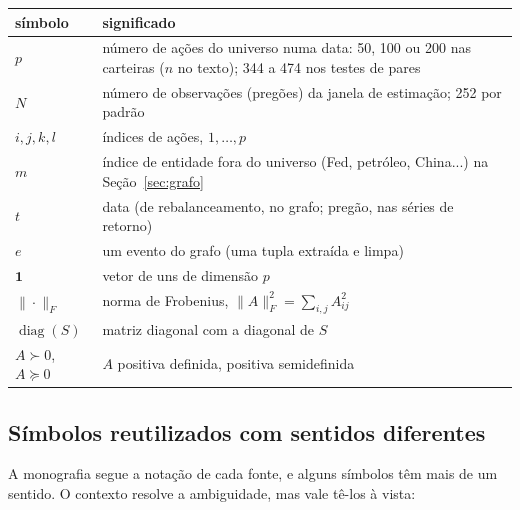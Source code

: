 \documentclass[11pt,a4paper]{article}
\newcommand{\un}{\mathbf 1}
\begin{document}
\begin{center}
\small
\begin{tabularx}{\textwidth}{>{\raggedright\arraybackslash}p{2.4cm}X}
\toprule
símbolo & significado \\
\midrule
$p$ & número de ações do universo numa data: 50, 100 ou 200 nas carteiras ($n$ no texto); 344 a 474 nos testes de pares \\
$N$ & número de observações (pregões) da janela de estimação; 252 por padrão \\
$i,j,k,l$ & índices de ações, $1,\dots,p$ \\
$m$ & índice de entidade fora do universo (Fed, petróleo, China...) na Seção~\ref{sec:grafo} \\
$t$ & data (de rebalanceamento, no grafo; pregão, nas séries de retorno) \\
$e$ & um evento do grafo (uma tupla extraída e limpa) \\
$\un$ & vetor de uns de dimensão $p$ \\
$\|\cdot\|_F$ & norma de Frobenius, $\|A\|_F^2=\sum_{i,j}A_{ij}^2$ \\
$\operatorname{diag}(S)$ & matriz diagonal com a diagonal de $S$ \\
$A\succ 0$, $A\succeq 0$ & $A$ positiva definida, positiva semidefinida \\
\bottomrule
\end{tabularx}
\end{center}

\subsection{Símbolos reutilizados com sentidos diferentes}

A monografia segue a notação de cada fonte, e alguns símbolos têm mais de um sentido. O contexto
resolve a ambiguidade, mas vale tê-los à vista:
\end{document}
